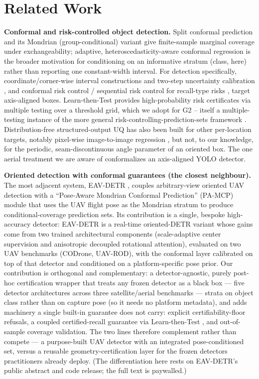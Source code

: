 \documentclass[journal]{IEEEtran}
\begin{document}
\section{Related Work}\label{sec:related}
\textbf{Conformal and risk-controlled object detection.} Split conformal prediction \citep{vovk2005algorithmic}
and its Mondrian (group-conditional) variant \citep{vovk2003mondrian} give finite-sample marginal coverage
under exchangeability; adaptive, heteroscedasticity-aware conformal regression \citep{romano2019cqr} is the
broader motivation for conditioning on an informative stratum (class, here) rather than reporting one
constant-width interval. For detection specifically, coordinate/corner-wise interval constructions and two-step
uncertainty calibration \citep{andeol2023conformal,timans2024twostep,ries2026probabilistic}, and conformal
risk control / sequential risk control for recall-type risks \citep{angelopoulos2022crc,andeol2025seqcrc},
target axis-aligned boxes. Learn-then-Test \citep{angelopoulos2021ltt} provides high-probability risk
certificates via multiple testing over a threshold grid, which we adopt for G2 -- itself a multiple-testing
instance of the more general risk-controlling-prediction-sets framework \citep{bates2021rcps}. Distribution-free
structured-output UQ has also been built for other per-location targets, notably pixel-wise image-to-image
regression \citep{angelopoulos2022im2im}, but not, to our knowledge, for the periodic, seam-discontinuous
angle parameter of an oriented box. The one aerial treatment we
are aware of \citep{copley2024copa} conformalizes an axis-aligned YOLO detector.

\textbf{Oriented detection with conformal guarantees (the closest neighbour).} The most adjacent system,
EAV-DETR \citep{eavdetr2026}, couples arbitrary-view oriented UAV detection with a ``Pose-Aware
Mondrian Conformal Prediction'' (PA-MCP) module that uses the UAV flight pose as the Mondrian stratum
to produce conditional-coverage prediction sets. Its contribution is a single, bespoke high-accuracy detector:
EAV-DETR is a real-time oriented-DETR variant whose gains come from two trained architectural
components (scale-adaptive center supervision and anisotropic decoupled rotational attention), evaluated on
two UAV benchmarks (CODrone, UAV-ROD), with the conformal layer calibrated on top of that detector and
conditioned on a platform-specific pose prior. Our contribution is orthogonal and complementary: a
detector-agnostic, purely post-hoc certification wrapper that treats any frozen detector as a
black box --- five detector architectures across three satellite/aerial benchmarks --- strata on object
class rather than on capture pose (so it needs no platform metadata), and adds machinery a single built-in
guarantee does not carry: explicit certifiability-floor refusals, a coupled certified-recall guarantee
via Learn-then-Test \citep{angelopoulos2021ltt}, and out-of-sample coverage validation. The two lines
therefore complement rather than compete --- a purpose-built UAV detector with an integrated pose-conditioned
set, versus a reusable geometry-certification layer for the frozen detectors practitioners already deploy.
(The differentiation here rests on EAV-DETR's public abstract and code release; the full text is paywalled.)
\end{document}
